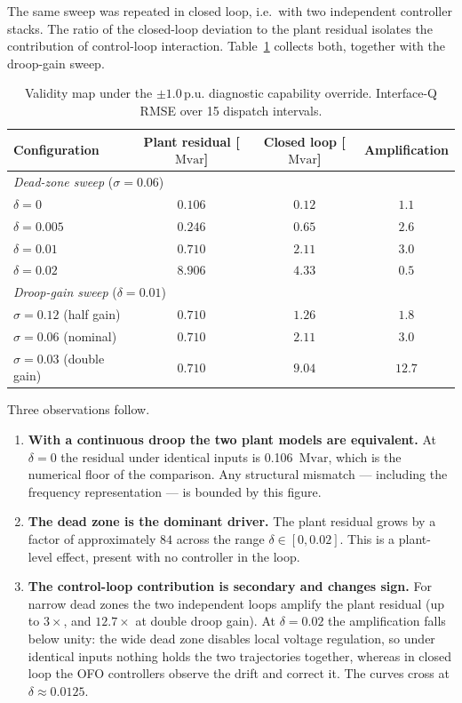 \documentclass[11pt,a4paper]{article}
\newcommand{\pu}{\ensuremath{\mathrm{p.u.}}}
\newcommand{\Mvar}{\ensuremath{\mathrm{Mvar}}}
\begin{document}
The same sweep was repeated in closed loop, i.e.\ with two independent
controller stacks. The ratio of the closed-loop deviation to the plant
residual isolates the contribution of control-loop interaction.
Table~\ref{tab:map} collects both, together with the droop-gain sweep.

\begin{table}[htbp]
  \centering
  \caption{Validity map under the $\pm1.0\,\pu$ diagnostic capability
  override. Interface-Q RMSE over 15 dispatch intervals.}
  \label{tab:map}
  \begin{tabular}{lccc}
    \toprule
    Configuration & Plant residual [\Mvar] & Closed loop [\Mvar] &
    Amplification \\
    \midrule
    \multicolumn{4}{l}{\emph{Dead-zone sweep} ($\sigma = 0.06$)}\\
    $\delta = 0$        & $0.106$ & $0.12$ & $1.1$ \\
    $\delta = 0.005$    & $0.246$ & $0.65$ & $2.6$ \\
    $\delta = 0.01$     & $0.710$ & $2.11$ & $3.0$ \\
    $\delta = 0.02$     & $8.906$ & $4.33$ & $0.5$ \\
    \midrule
    \multicolumn{4}{l}{\emph{Droop-gain sweep} ($\delta = 0.01$)}\\
    $\sigma = 0.12$ (half gain)   & $0.710$ & $1.26$ & $1.8$ \\
    $\sigma = 0.06$ (nominal)     & $0.710$ & $2.11$ & $3.0$ \\
    $\sigma = 0.03$ (double gain) & $0.710$ & $9.04$ & $12.7$ \\
    \bottomrule
  \end{tabular}
\end{table}

Three observations follow.

\begin{enumerate}
  \item \textbf{With a continuous droop the two plant models are
        equivalent.} At $\delta = 0$ the residual under identical inputs is
        \SI{0.106}{\Mvar}, which is the numerical floor of the comparison.
        Any structural mismatch --- including the frequency representation
        --- is bounded by this figure.
  \item \textbf{The dead zone is the dominant driver.} The plant residual
        grows by a factor of approximately $84$ across the range
        $\delta \in [0, 0.02]$. This is a plant-level effect, present with
        no controller in the loop.
  \item \textbf{The control-loop contribution is secondary and changes
        sign.} For narrow dead zones the two independent loops amplify the
        plant residual (up to $3\times$, and $12.7\times$ at double droop
        gain). At $\delta = 0.02$ the amplification falls below unity: the
        wide dead zone disables local voltage regulation, so under identical
        inputs nothing holds the two trajectories together, whereas in
        closed loop the OFO controllers observe the drift and correct it.
        The curves cross at $\delta \approx 0.0125$.
\end{enumerate}
\end{document}
